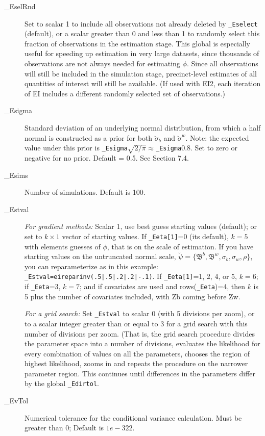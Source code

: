 \documentclass[11pt,titlepage]{article}
\newcommand{\bbeta}{{\mathfrak B}}
\newcommand{\sigmau}{\breve{\sigma}}
\newcommand{\psiu}{\breve{\psi}}
\begin{document}
\begin{description}
\item[\_EselRnd] Set to scalar 1 to include all observations not
  already deleted by \texttt{\_Eselect} (default), or a scalar greater
  than 0 and less than 1 to randomly select this fraction of
  observations in the estimation stage.  This global is especially
  useful for speeding up estimation in very large datasets, since
  thousands of observations are not always needed for estimating
  $\phi$.  Since all observations will still be included in the
  simulation stage, precinct-level estimates of all quantities of
  interest will still be available.  (If used with EI2, each iteration
  of EI includes a different randomly selected set of observations.)

\item[\_Esigma] Standard deviation of an underlying normal
  distribution, from which a half normal is constructed as a prior for
  both $\sigmau_b$ and $\sigmau^w$.  Note: the expected value under
  this prior is \texttt{\_Esigma}$\sqrt{2/\pi}
  \approx$\texttt{\_Esigma}0.8.  Set to zero or negative for no prior.
  Default = 0.5.  See Section 7.4.

\item[\_Esims] Number of simulations. Default is 100.

\item[\_Estval] \emph{For gradient methods:} Scalar 1, use best guess
  starting values (default); or set to $k\times 1$ vector of starting
  values.  If \texttt{\_Eeta[1]}=0 (its default), $k=5$ with elements
  guesses of $\phi$, that is on the scale of estimation.  If you have
  starting values on the untruncated normal scale,
  $\psiu=\{\bbeta^b,\bbeta^w,\sigma_b,\sigma_w,\rho\}$, you can
  reparameterize as in this example:
  \texttt{\_Estval=eireparinv(.5|.5|.2|.2|-.1)}.  If
  \texttt{\_Eeta[1]}=1, 2, 4, or 5, $k=6$; if \texttt{\_Eeta}=3,
  $k=7$; and if covariates are used and rows(\texttt{\_Eeta})=4, then
  $k$ is 5 plus the number of covariates included, with Zb coming
  before Zw.

  \emph{For a grid search:} Set \texttt{\_Estval} to scalar 0 (with 5
  divisions per zoom), or to a scalar integer greater than or equal to
  3 for a grid search with this number of divisions per zoom.  (That
  is, the grid search procedure divides the parameter space into a
  number of divisions, evaluates the likelihood for every combination
  of values on all the parameters, chooses the region of highest
  likelihood, zooms in and repeats the procedure on the narrower
  parameter region.  This continues until differences in the
  parameters differ by the global \texttt{\_Edirtol}.

\item[\_EvTol] Numerical tolerance for the conditional variance
  calculation.  Must be greater than 0; Default is $1e-322$.
\end{description}
\end{document}
